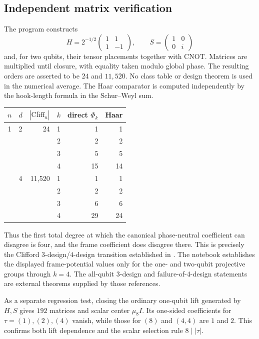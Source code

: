 \documentclass[10pt]{article}
\begin{document}
\subsection{Independent matrix verification}
The program constructs
\[
H=2^{-1/2}\begin{pmatrix}1&1\\1&-1\end{pmatrix},\qquad
S=\begin{pmatrix}1&0\\0&i\end{pmatrix}
\]
and, for two qubits, their tensor placements together with CNOT.  Matrices
are multiplied until closure, with equality taken modulo global phase.  The
resulting orders are asserted to be $24$ and $11{,}520$.  No class table or
design theorem is used in the numerical average.  The Haar comparator is
computed independently by the hook-length formula in the Schur--Weyl sum.

\begin{center}
\begin{tabular}{@{}ccrrrr@{}}\toprule
$n$&$d$&$|\overline{\mathrm{Cliff}}_n|$&$k$&direct $\Phi_k$&Haar\\\midrule
1&2&24&1&1&1\\
 &&&2&2&2\\
 &&&3&5&5\\
 &&&4&15&14\\\addlinespace
2&4&11,520&1&1&1\\
 &&&2&2&2\\
 &&&3&6&6\\
 &&&4&29&24\\\bottomrule
\end{tabular}
\end{center}
Thus the first total degree at which the canonical phase-neutral coefficient
can disagree is four, and the frame coefficient does disagree there.
This is precisely the Clifford $3$-design/$4$-design transition established
in \cite{clifford-groups-proof-and-verification:zhu3design,clifford-groups-proof-and-verification:graceful}.
The notebook establishes the displayed frame-potential values only for the
one- and two-qubit projective groups through $k=4$.  The all-qubit 3-design
and failure-of-4-design statements are external theorems supplied by those
references.

As a separate regression test, closing the ordinary one-qubit lift generated
by $H,S$ gives $192$ matrices and scalar center $\mu_8I$.  Its one-sided
coefficients for $\tau=(1),(2),(4)$ vanish, while those for $(8)$ and $(4,4)$
are $1$ and $2$.  This confirms both lift dependence and the scalar selection
rule $8\mid|\tau|$.
\end{document}
